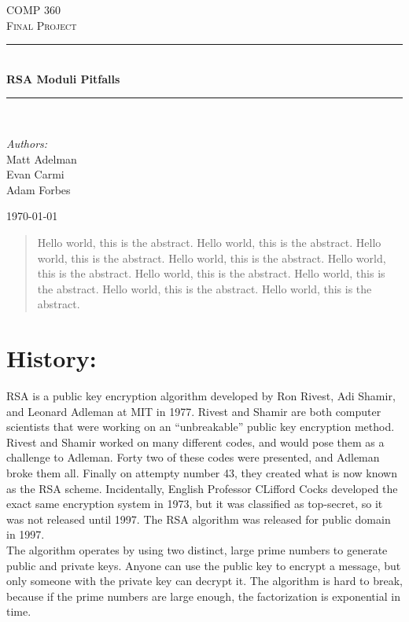 \documentclass[12pt]{article}
\newcommand{\HRule}{\rule{\linewidth}{0.5mm}}
\begin{document}
\begin{titlepage}

\begin{center}
\textsc{\LARGE COMP 360}\\[1.5cm]
\textsc{\Large Final Project}\\[0.5cm]
\HRule \\[0.4cm]
{ \huge \bfseries RSA Moduli Pitfalls}\\[0.4cm]
\HRule \\[1.5cm]
\begin{minipage}{0.4\textwidth}
\begin{center} \large
\emph{Authors:}\\
Matt Adelman\\Evan Carmi\\Adam Forbes
\end{center}
\end{minipage}
\vfill
{\large \today}
\end{center}
\end{titlepage}

\tableofcontents

\newpage

\begin{abstract}
  Hello world, this is the abstract.  Hello world, this is the abstract.
  Hello world, this is the abstract.  Hello world, this is the abstract.  Hello world, this is the abstract.  Hello world, this is the abstract.  Hello world, this is the abstract.  Hello world, this is the abstract.  Hello world, this is the abstract.
\end{abstract}

\section{History:}
RSA is a public key encryption algorithm developed by Ron Rivest, Adi Shamir, 
and Leonard Adleman at MIT in 1977. Rivest and Shamir are both computer
scientists that were working on an ``unbreakable'' public key encryption method.
Rivest and Shamir worked on many different codes, and would pose them as a
challenge to Adleman. Forty two of these codes were presented, and Adleman broke
them all. Finally on attempty number 43, they created what is now known as the
RSA scheme. Incidentally, English Professor CLifford Cocks developed the exact
same encryption system in 1973, but it was classified as top-secret, so it was
not released until 1997. The RSA algorithm was released for public domain in
1997.\\
The algorithm operates by using two distinct, large prime numbers to generate
public and private keys. Anyone can use the public key to encrypt a message, but
only someone with the private key can decrypt it. The algorithm is hard to
break, because if the prime numbers are large enough, the factorization is
exponential in time.
\end{document}
